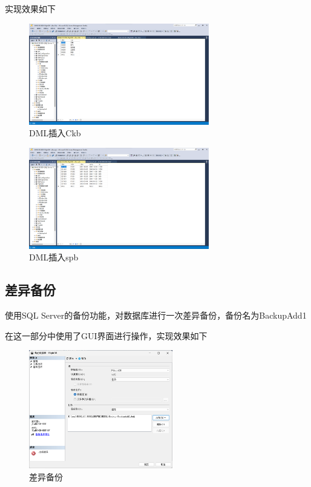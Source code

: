 \documentclass[UTF8,12pt]{article}
\begin{document}
实现效果如下

\begin{figure}[htbp]
    \centering
    \includegraphics[width=0.7\textwidth]{img/7.png}
    \caption{DML插入Ckb}
\end{figure}

\begin{figure}[htbp]
    \centering
    \includegraphics[width=0.7\textwidth]{img/8.png}
    \caption{DML插入spb}
\end{figure}

\subsection{差异备份}
使用SQL Server的备份功能，对数据库进行一次差异备份，备份名为BackupAdd1

在这一部分中使用了GUI界面进行操作，实现效果如下
\begin{figure}[htbp]
    \centering
    \includegraphics[width=0.56\textwidth]{img/9.png}
    \caption{差异备份}
\end{figure}
\end{document}
